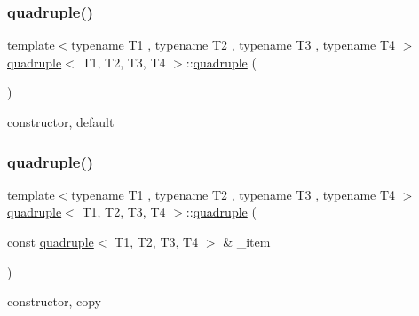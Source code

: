 \subsubsection{\texorpdfstring{quadruple()}{quadruple()}\hspace{0.1cm}{\footnotesize\ttfamily [1/3]}}
{\footnotesize\ttfamily template$<$typename T1 , typename T2 , typename T3 , typename T4 $>$ \\
\hyperlink{structquadruple}{quadruple}$<$ T1, T2, T3, T4 $>$\+::\hyperlink{structquadruple}{quadruple} (\begin{DoxyParamCaption}{ }\end{DoxyParamCaption})\hspace{0.3cm}{\ttfamily [inline]}}



constructor, default 

\mbox{\label{structquadruple_a24c753a7c00f8325bf7f738815e89d06}} 
\subsubsection{\texorpdfstring{quadruple()}{quadruple()}\hspace{0.1cm}{\footnotesize\ttfamily [2/3]}}
{\footnotesize\ttfamily template$<$typename T1 , typename T2 , typename T3 , typename T4 $>$ \\
\hyperlink{structquadruple}{quadruple}$<$ T1, T2, T3, T4 $>$\+::\hyperlink{structquadruple}{quadruple} (\begin{DoxyParamCaption}\item[{const \hyperlink{structquadruple}{quadruple}$<$ T1, T2, T3, T4 $>$ \&}]{\+\_\+item }\end{DoxyParamCaption})\hspace{0.3cm}{\ttfamily [inline]}}



constructor, copy 

\mbox{\label{structquadruple_a23034a914f2841aa59c833bb3923f1b6}} 
